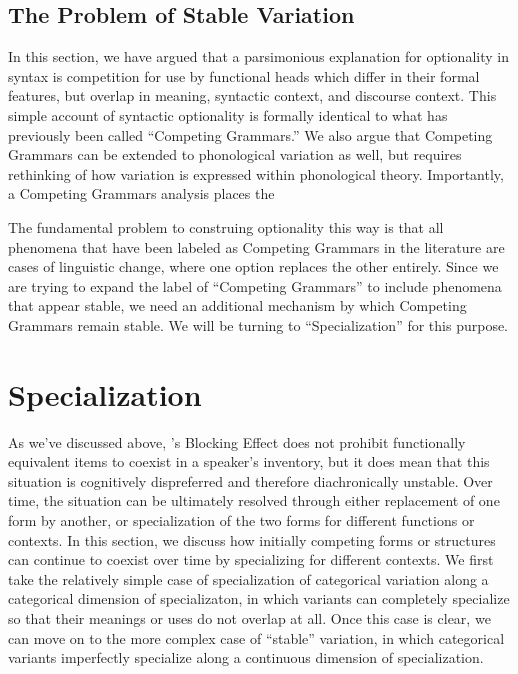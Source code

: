 \subsection{The Problem of Stable Variation}


In this section, we have argued that a parsimonious explanation for optionality in syntax is competition for use by functional heads which differ in their formal features, but overlap in meaning, syntactic context, and discourse context.
This simple account of syntactic optionality is formally identical to what has previously been called ``Competing Grammars.''
We also argue that Competing Grammars can be extended to phonological variation as well, but requires rethinking of how variation is expressed within phonological theory.
Importantly, a Competing Grammars analysis places the 

The fundamental problem to construing optionality this way is that all phenomena that have been labeled as Competing Grammars in the literature are cases of linguistic change, where one option replaces the other entirely.
Since we are trying to expand the label of ``Competing Grammars'' to include phenomena that appear stable, we need an additional mechanism by which Competing Grammars remain stable.
We will be turning to ``Specialization'' for this purpose.



\section{Specialization}
\label{solution}

As we've discussed above, \citet{kroch1994}'s Blocking Effect does not prohibit functionally equivalent items to coexist in a speaker's inventory, but it does mean that this situation is cognitively dispreferred and therefore diachronically unstable.
Over time, the situation can be ultimately resolved through either replacement of one form by another, or specialization of the two forms for different functions or contexts.
In this section, we discuss how initially competing forms or structures can continue to coexist over time by specializing for different contexts.
We first take the relatively simple case of specialization of categorical variation along a categorical dimension of specializaton, in which variants can completely specialize so that their meanings or uses do not overlap at all.
Once this case is clear, we can move on to the more complex case of ``stable'' variation, in which categorical variants imperfectly specialize along a continuous dimension of specialization.

